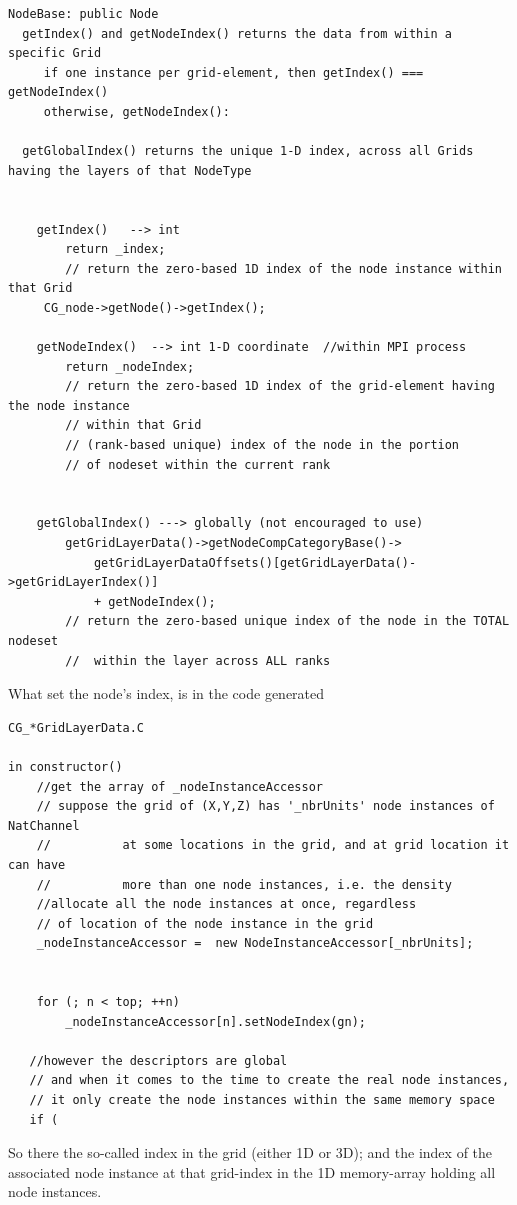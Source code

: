 \begin{verbatim}
NodeBase: public Node
  getIndex() and getNodeIndex() returns the data from within a specific Grid
     if one instance per grid-element, then getIndex() === getNodeIndex()
     otherwise, getNodeIndex(): 

  getGlobalIndex() returns the unique 1-D index, across all Grids having the layers of that NodeType


	getIndex()   --> int 
	    return _index;
	    // return the zero-based 1D index of the node instance within that Grid
     CG_node->getNode()->getIndex();
		
	getNodeIndex() 	--> int 1-D coordinate  //within MPI process
		return _nodeIndex;
		// return the zero-based 1D index of the grid-element having the node instance
		// within that Grid
		// (rank-based unique) index of the node in the portion
		// of nodeset within the current rank
		
		
	getGlobalIndex() ---> globally (not encouraged to use)
		getGridLayerData()->getNodeCompCategoryBase()->
			getGridLayerDataOffsets()[getGridLayerData()->getGridLayerIndex()]
			+ getNodeIndex();
		// return the zero-based unique index of the node in the TOTAL nodeset 
		//  within the layer across ALL ranks
\end{verbatim}


What set the node's index, is in the code generated
\begin{verbatim}
CG_*GridLayerData.C

in constructor()
    //get the array of _nodeInstanceAccessor
    // suppose the grid of (X,Y,Z) has '_nbrUnits' node instances of NatChannel
    //          at some locations in the grid, and at grid location it can have
    //          more than one node instances, i.e. the density
    //allocate all the node instances at once, regardless 
    // of location of the node instance in the grid 
    _nodeInstanceAccessor =  new NodeInstanceAccessor[_nbrUnits];
    
     
    for (; n < top; ++n)
        _nodeInstanceAccessor[n].setNodeIndex(gn);
        
   //however the descriptors are global
   // and when it comes to the time to create the real node instances, 
   // it only create the node instances within the same memory space
   if (
\end{verbatim}

So there the so-called index in the grid (either 1D or 3D); and the index of the
associated node instance at that grid-index in the 1D memory-array holding all
node instances.


